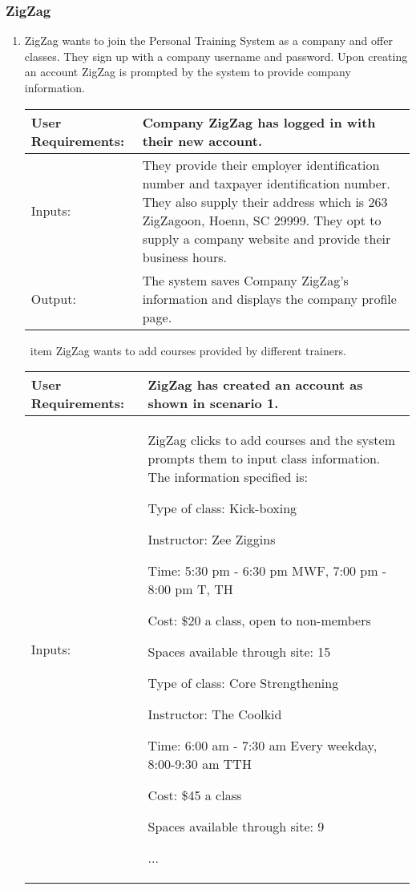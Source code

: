 \documentclass[12pt]{article}
\begin{document}
\subsubsection{ZigZag}
\begin{enumerate}
\item ZigZag wants to join the Personal Training System as a company and offer classes. They sign up with a company username and password.  Upon creating an account ZigZag is prompted by the system to provide company information.

\begin{tabular}{| m{4cm} | m{11cm} |}
\hline
User Requirements: & Company ZigZag has logged in with their new account. \\
\hline
Inputs: & They provide their employer identification number and taxpayer identification number.  They also supply their address which is 263 ZigZagoon, Hoenn, SC 29999. They opt to supply a company website and provide their business hours. \\
\hline
Output: & The system saves Company ZigZag’s information and displays the company profile page. \\
\hline
\end{tabular}

\ item ZigZag wants to add courses provided by different trainers.

\begin{tabular}{| m{4cm} | m{11cm} |}
\hline
User Requirements: & ZigZag has created an account as shown in scenario 1. \\
\hline
Inputs: & ZigZag clicks to add courses and the system prompts them to input class information.  The information specified is:

Type of class:  Kick-boxing

Instructor: Zee Ziggins 

Time: 5:30 pm - 6:30 pm MWF, 7:00 pm - 8:00 pm T, TH

Cost: \$20 a class, open to non-members

Spaces available through site: 15
\newline

Type of class: Core Strengthening

Instructor: The Coolkid

Time: 6:00 am - 7:30 am Every weekday, 8:00-9:30 am TTH

Cost: \$45 a class

Spaces available through site: 9

...


\end{tabular}
\end{enumerate}
\end{document}
